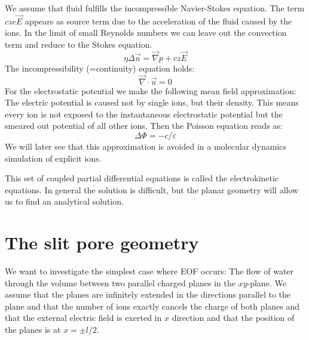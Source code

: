 We assume that fluid fulfills the incompressible Navier-Stokes equation.
The term $c z e \vec{E}$ appears as source term due
to the acceleration of the fluid caused by the ions. 
In the limit of small Reynolds numbers we can leave out
the convection term and reduce to the Stokes equation.
\begin{equation}
  \eta \Delta \vec{u} = \vec{\nabla} p + c z \vec{E}
\end{equation}
The incompressibility (=continuity) equation holds:
\begin{equation}
  \vec{\nabla} \cdot \vec{u} = 0
\end{equation}
For the electrostatic potential we make the following
mean field approximation: The electric potential is 
caused not by single ions, but their density. This means
every ion is not exposed to the instantaneous electrostatic potential
but the smeared out potential of all other ions. Then the Poisson
equation reads as:
\begin{equation}
  \Delta \Phi = -c/\varepsilon
  \label{asdf}
\end{equation}
We will later
see that this approximation is avoided in a molecular dynamics simulation
of explicit ions.

This set of coupled partial differential equations is called
the electrokinetic equations. In general the solution is difficult,
but the planar geometry will allow us to find an analytical 
solution.

\section{The slit pore geometry}
We want to investigate the simplest case where EOF occurs:
The flow of water through the volume between two parallel
charged planes in the $xy$-plane. We assume that the planes are infinitely
extended in the directions parallel to the plane and that
the number of ions exactly cancels the charge of both planes
and that the external electric field is exerted in $x$ direction
and that the position of the planes is at $x=\pm l/2$.


